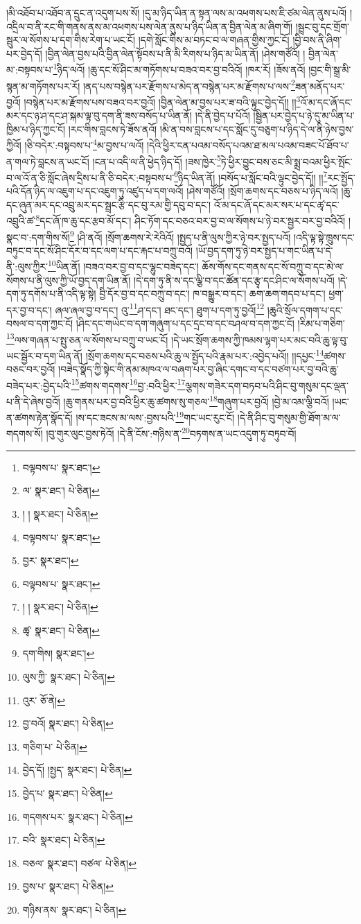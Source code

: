 །མི་འཐོབ་པ་འཐོབ་ན་དྲུང་ན་འདུག་པས་སོ། །དུ་མ་ཉིད་ཡིན་ན་སྟན་ལས་མ་འཕགས་པས་ཇི་ཙམ་ལེན་ནུས་པའོ། །འདྲིལ་བ་ནི་རང་གི་གནས་ནས་མ་འཕགས་པས་ལེན་ནུས་པ་ཉིད་ཡིན་ན་བྱིན་ལེན་མ་ཞིག་གོ། །སྦྲང་བུ་དང་གྲོག་སྦུར་ལ་སོགས་པ་དག་གིས་རེག་པ་ཡང་ངོ། །དགེ་སློང་གིས་མ་བཏང་བ་ལ་གཞན་གྱིས་ཀྱང་ངོ། །བྱི་བས་ནི་ཞིག་པར་བྱེད་དོ། །བྱིན་ལེན་བྱས་པའི་བྱིན་ལེན་སྟོབས་པ་ནི་མི་རིགས་པ་ཉིད་མ་ཡིན་ནོ། །ཤེས་གཙོའོ། །
བྱིན་ལེན་མ་:བསྟབས་པ་\footnote{བལྟབས་པ་  སྣར་ཐང་། }ཉིད་ལའོ། །ཆུ་དང་སོ་ཤིང་མ་གཏོགས་པ་བཟའ་བར་བྱ་བའིའོ། །ཁར་རོ། །ཟོས་ནའོ། །བྱང་གི་སྒྲ་མི་སྙན་མ་གཏོགས་པར་རོ། །ནད་པས་བསྙེན་པར་རྫོགས་པ་མེད་ན་བསྙེན་པར་མ་རྫོགས་པ་ལས་\footnote{ལ་  སྣར་ཐང་།  པེ་ཅིན། }ཟན་མནོད་པར་བྱའོ། །བསྙེན་པར་མ་རྫོགས་པས་བཟའ་བར་བྱའོ། །བྱིན་ལེན་མ་བྱས་པར་ཟ་བའི་ལྟུང་བྱེད་དོ།། །།\footnote{། །  སྣར་ཐང་།  པེ་ཅིན། }འོ་མ་དང་ཞོ་དང་མར་དང་ཉ་ཤ་དང་ཤ་སྐམ་ལྟ་བུ་དག་ནི་ཟས་བསོད་པ་ཡིན་ནོ། །དེ་ནི་བྱེད་པ་པོའོ། །སྦྱིན་པར་བྱེད་པ་ཉེ་དུ་མ་ཡིན་པ་ཁྱིམ་པ་ཉིད་ཀྱང་ངོ། །རང་གིས་བླངས་ཏེ་ཟོས་ནའོ། །མི་ན་བས་བླངས་པ་དང་སློང་དུ་བཅུག་པ་ཉིད་དེ་ལ་ནི་ཉེས་བྱས་ཀྱིའོ། །ཅི་བདེར་:བསྟབས་པ་\footnote{བལྟབས་པ་  སྣར་ཐང་། }མ་བྱས་པ་ལའོ། །དེའི་ཕྱིར་ངན་པའམ་བསོད་པའམ་ཐ་མལ་པའམ་བཟང་པོ་ཐོབ་པ་ན་གལ་ཏེ་བླངས་ན་ཡང་ངོ། །ངན་པ་འདི་ལ་ནི་ཕྱེད་ཉིད་དོ། །ཟས་ཁྱེར་\footnote{བྱར་  སྣར་ཐང་། }ཏེ་ཕྱིར་བྱུང་བས་ཅང་མི་སྨྲ་བའམ་ཕྱིར་སྤོང་བ་ལ་འོ་ན་ཅི་སློང་ཞེས་དྲིས་པ་ནི་ཅི་བདེར་:བསྟབས་པ་\footnote{བལྟབས་པ་  སྣར་ཐང་། }ཉིད་ཡིན་ནོ། །བསོད་པ་སློང་བའི་ལྟུང་བྱེད་དོ།། །།\footnote{། །  སྣར་ཐང་།  པེ་ཅིན། }རང་སྤྱོད་པའི་དོན་ཉིད་ལ་འཇུག་པ་དང་འཇུག་ཏུ་འཛུད་པ་དག་ལའོ། །ཤེས་གཙོའོ། །སྲོག་ཆགས་དང་བཅས་པ་ཉིད་ལའོ། །ཆུ་དང་ཞུན་མར་དང་འབྲུ་མར་དང་སྦྲང་རྩི་དང་བུ་རམ་གྱི་དབུ་བ་དང་། འོ་མ་དང་ཞོ་དང་མར་སར་པ་དང་ཚྭ་དང་འབྲུའི་ཚ་\footnote{ཚྭ་  སྣར་ཐང་།  པེ་ཅིན། }དང་ཞོ་ཁ་ཆུ་དང་རྩབ་མོ་དང་། ཤིང་ཏོག་དང་བཅའ་བར་བྱ་བ་ལ་སོགས་པ་ཉེ་བར་སྦྱར་བར་བྱ་བའིའོ། །སྣང་བ་:དག་གིས་སོ།\footnote{དག་གིས།  སྣར་ཐང་། } །ཤི་ནའོ། །སྲོག་ཆགས་རེ་རེའིའོ། །སྤྱད་པ་ནི་ལུས་ཀྱིར་ཉེ་བར་སྤྱད་པའོ། །འདི་ལྟ་སྟེ་ཁྲུས་དང་བཏུང་བ་དང་སོ་ཤིང་དོར་བ་དང་ལག་པ་དང་རྐང་པ་བཀྲུ་བའོ། །ཡོ་བྱད་དག་ཏུ་ཉེ་བར་སྤྱད་པ་གང་ཡིན་པ་དེ་ནི་:ལུས་ཀྱིར་\footnote{ལུས་ཀྱི་  སྣར་ཐང་།  པེ་ཅིན། }ཡིན་ནོ། །བཟའ་བར་བྱ་བ་དང་ལྷུང་བཟེད་དང་། ཆོས་གོས་དང་གནས་དང་སོ་བཀྲུ་བ་དང་མེ་ལ་སོགས་པ་ནི་ལུས་ཀྱི་ཡོ་བྱད་དག་ཡིན་ནོ། །དེ་དག་ཏུ་ནི་ས་དང་ལྕི་བ་དང་ཚོན་དང་རྩྭ་དང་ཤིང་ལ་སོགས་པའོ། །དེ་དག་ཏུ་དགོས་པ་ནི་འདི་ལྟ་སྟེ། བྱི་དོར་བྱ་བ་དང་བཀྲུ་བ་དང་། ཁ་བསྒྱུར་བ་དང་། ཆག་ཆག་གདབ་པ་དང་། ཕྱག་དར་བྱ་བ་དང་། ཞལ་ཞལ་བྱ་བ་དང་། འུ་\footnote{འུར་  ཅོ་ནེ། }ཤ་དང་། ཐང་དང་། ཐུག་པ་དག་ཏུ་བྱའོ།\footnote{བྱ་བའོ།  སྣར་ཐང་།  པེ་ཅིན། } །ཆུའི་སྲོལ་དགག་པ་དང་བསལ་བ་དག་ཀྱང་ངོ། །ཤིང་དང་གཡེང་བ་དག་གཞུག་པ་དང་དྲང་བ་དང་བཤལ་བ་དག་ཀྱང་ངོ། །རིམ་པ་གཅིག་\footnote{གཅིག་པ་  པེ་ཅིན། }ལས་གཞན་པ་སྤུ་ཅན་ལ་སོགས་པ་བཀྲུ་བ་ཡང་ངོ། །དེ་ཡང་སྲོག་ཆགས་ཀྱི་ཁམས་ལྷག་པར་མང་བའི་ཆུ་ལྟ་བུ་ཡང་སྦྱོར་བ་དག་ཡིན་ནོ། །སྲོག་ཆགས་དང་བཅས་པའི་ཆུ་ལ་སྤྱོད་པའི་རྣམ་པར་:འབྱེད་པའོ།། །།དཔྱང་\footnote{བྱེད་དོ། །སྤྱད་  སྣར་ཐང་།  པེ་ཅིན། }ཚགས་བཅང་བར་བྱའོ། །བཟེད་སྣོད་ཀྱི་སྟེང་གི་ནམ་མཁའ་ལ་བཞག་པར་བྱ་ཞིང་དགང་བ་དང་བཙག་པར་བྱ་བའི་ཆུ་བཟེད་པར་:བྱེད་པའི་\footnote{བྱེད་པ་  སྣར་ཐང་།  པེ་ཅིན། }ཚགས་གདགས་\footnote{གདགས་པར་  སྣར་ཐང་།  པེ་ཅིན། }བྱ་:བའི་ཕྱིར་\footnote{བའི་  སྣར་ཐང་།  པེ་ཅིན། }ལྕགས་གཟེར་དག་བཏབ་པའི་ཤིང་བུ་གསུམ་དང་ལྡན་པ་ནི་དེ་ཞེས་བྱའོ། །ཆུ་གནས་པར་བྱ་བའི་ཕྱིར་ཆུ་ཚགས་སུ་གཅལ་\footnote{བཅལ་  སྣར་ཐང་། བཙལ་  པེ་ཅིན། }གཞུག་པར་བྱའོ། །བྱེ་མ་འམ་ལྕི་བའོ། །ཡང་ན་ཚགས་རྟེན་སྣོད་དོ། །ས་དང་ཟངས་མ་ལས་:བྱས་པའི་\footnote{བྱས་པ་  སྣར་ཐང་།  པེ་ཅིན། }གང་ཡང་རུང་ངོ། །དེ་ནི་ཤིང་བུ་གསུམ་གྱི་ཐོག་མ་ལ་གདགས་སོ། །བུ་གུར་ལུང་བྱས་ཏེའོ། །དེ་ནི་ངོས་:གཉིས་ན་\footnote{གཉིས་ནས་  སྣར་ཐང་།  པེ་ཅིན། }བཏགས་ན་ཡང་འདུག་ཏུ་བཏུབ་བོ། 